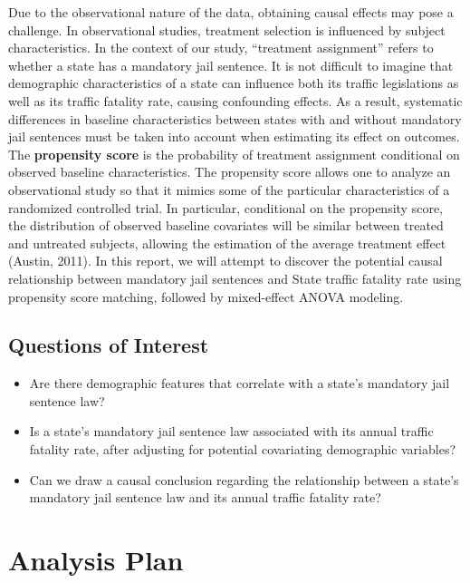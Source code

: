 \documentclass[]{article}
\providecommand{\tightlist}{%
  \setlength{\itemsep}{0pt}\setlength{\parskip}{0pt}}
\begin{document}
Due to the observational nature of the data, obtaining causal effects may pose a challenge. In observational studies, treatment selection is influenced by subject characteristics. In the context of our study, ``treatment assignment'' refers to whether a state has a mandatory jail sentence. It is not difficult to imagine that demographic characteristics of a state can influence both its traffic legislations as well as its traffic fatality rate, causing confounding effects. As a result, systematic differences in baseline characteristics between states with and without mandatory jail sentences must be taken into account when estimating its effect on outcomes. The \textbf{propensity score} is the probability of treatment assignment conditional on observed baseline characteristics. The propensity score allows one to analyze an observational study so that it mimics some of the particular characteristics of a randomized controlled trial. In particular, conditional on the propensity score, the distribution of observed baseline covariates will be similar between treated and untreated subjects, allowing the estimation of the average treatment effect (Austin, 2011). In this report, we will attempt to discover the potential causal relationship between mandatory jail sentences and State traffic fatality rate using propensity score matching, followed by mixed-effect ANOVA modeling.

\hypertarget{questions-of-interest}{%
\subsection{Questions of Interest}\label{questions-of-interest}}

\begin{itemize}
\tightlist
\item
  Are there demographic features that correlate with a state's mandatory jail sentence law?\\
\item
  Is a state's mandatory jail sentence law associated with its annual traffic fatality rate, after adjusting for potential covariating demographic variables?\\
\item
  Can we draw a causal conclusion regarding the relationship between a state's mandatory jail sentence law and its annual traffic fatality rate?
\end{itemize}

\hypertarget{analysis-plan}{%
\section{Analysis Plan}\label{analysis-plan}}
\end{document}
